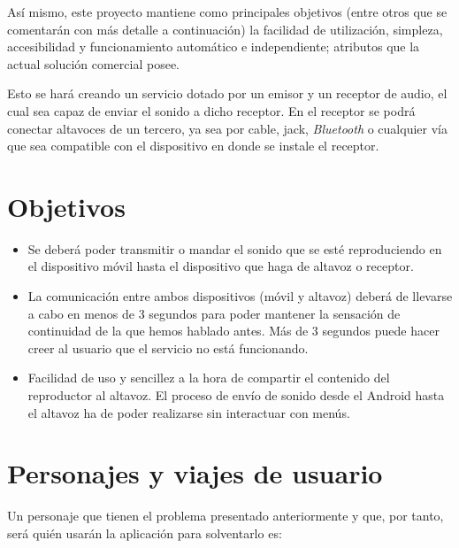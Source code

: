 Así mismo, este proyecto mantiene como principales objetivos (entre otros que se
comentarán con más detalle a continuación) la facilidad de utilización,
simpleza, accesibilidad y funcionamiento automático e independiente; atributos
que la actual solución comercial posee.

Esto se hará creando un servicio dotado por un emisor y un receptor de audio, el
cual sea capaz de enviar el sonido a dicho receptor. En el receptor se podrá
conectar altavoces de un tercero, ya sea por cable, jack, \emph{Bluetooth} o
cualquier vía que sea compatible con el dispositivo en donde se instale el
receptor.

\section{Objetivos}
\begin{itemize}
    \item Se deberá poder transmitir o mandar el sonido que se esté
    reproduciendo en el dispositivo móvil hasta el dispositivo que haga de
    altavoz o receptor.
    \item La comunicación entre ambos dispositivos (móvil y altavoz) deberá de
    llevarse a cabo en menos de 3 segundos para poder mantener la sensación de
    continuidad de la que hemos hablado antes. Más de 3 segundos puede hacer
    creer al usuario que el servicio no está funcionando.
    \item Facilidad de uso y sencillez a la hora de compartir el contenido del
    reproductor al altavoz. El proceso de envío de sonido desde el Android hasta
    el altavoz ha de poder realizarse sin interactuar con menús.
\end{itemize}

\section{Personajes y viajes de usuario}
Un personaje que tienen el problema presentado anteriormente y que, por tanto,
será quién usarán la aplicación para solventarlo es:

